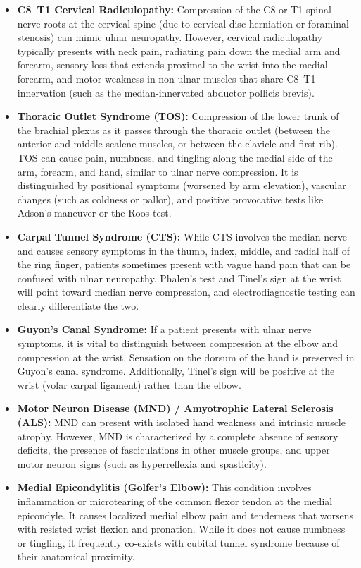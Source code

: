 \begin{itemize}
\item \textbf{C8--T1 Cervical Radiculopathy:} Compression of the C8 or T1 spinal nerve roots at the cervical spine (due to cervical disc herniation or foraminal stenosis) can mimic ulnar neuropathy. However, cervical radiculopathy typically presents with neck pain, radiating pain down the medial arm and forearm, sensory loss that extends proximal to the wrist into the medial forearm, and motor weakness in non-ulnar muscles that share C8--T1 innervation (such as the median-innervated abductor pollicis brevis).
\item \textbf{Thoracic Outlet Syndrome (TOS):} Compression of the lower trunk of the brachial plexus as it passes through the thoracic outlet (between the anterior and middle scalene muscles, or between the clavicle and first rib). TOS can cause pain, numbness, and tingling along the medial side of the arm, forearm, and hand, similar to ulnar nerve compression. It is distinguished by positional symptoms (worsened by arm elevation), vascular changes (such as coldness or pallor), and positive provocative tests like Adson's maneuver or the Roos test.
\item \textbf{Carpal Tunnel Syndrome (CTS):} While CTS involves the median nerve and causes sensory symptoms in the thumb, index, middle, and radial half of the ring finger, patients sometimes present with vague hand pain that can be confused with ulnar neuropathy. Phalen's test and Tinel's sign at the wrist will point toward median nerve compression, and electrodiagnostic testing can clearly differentiate the two.
\item \textbf{Guyon's Canal Syndrome:} If a patient presents with ulnar nerve symptoms, it is vital to distinguish between compression at the elbow and compression at the wrist. Sensation on the dorsum of the hand is preserved in Guyon's canal syndrome. Additionally, Tinel's sign will be positive at the wrist (volar carpal ligament) rather than the elbow.
\item \textbf{Motor Neuron Disease (MND) / Amyotrophic Lateral Sclerosis (ALS):} MND can present with isolated hand weakness and intrinsic muscle atrophy. However, MND is characterized by a complete absence of sensory deficits, the presence of fasciculations in other muscle groups, and upper motor neuron signs (such as hyperreflexia and spasticity).
\item \textbf{Medial Epicondylitis (Golfer's Elbow):} This condition involves inflammation or microtearing of the common flexor tendon at the medial epicondyle. It causes localized medial elbow pain and tenderness that worsens with resisted wrist flexion and pronation. While it does not cause numbness or tingling, it frequently co-exists with cubital tunnel syndrome because of their anatomical proximity.
\end{itemize}

